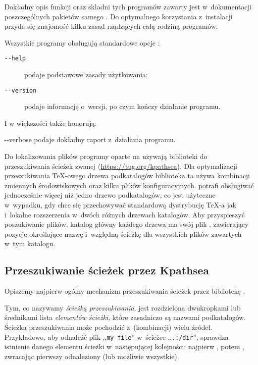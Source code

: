 \documentclass{article}
\renewcommand{\samp}[1]{,,\texttt{#1}''}  %
\begin{document}
\noindent
Dokładny opis funkcji oraz składni tych programów zawarty jest
w~dokumentacji poszczególnych pakietów samego \Webc{}.
Do optymalnego korzystania z~instalacji \Webc{}
przyda się  znajomość kilku zasad rządzących całą rodziną programów.

Wszystkie programy obsługują standardowe opcje \GNU:
\begin{description}
\item[\texttt{-{}-help\ \ \ }] podaje podstawowe zasady użytkowania;
\item[\texttt{-{}-version}] podaje informację o~wersji, po czym kończy
                          działanie programu.
\end{description}

I w większości także honorują:
\begin{ttdescription}
\item[-{}-verbose] podaje dokładny raport z~działania programu.
\end{ttdescription}



Do lokalizowania plików programy oparte na \Webc{} używają biblioteki do
przeszukiwania ścieżek zwanej \KPS{} (\url{https://tug.org/kpathsea}).
Dla optymalizacji przeszukiwania \TeX-owego drzewa podkatalogów biblioteka ta
używa kombinacji zmiennych środowiskowych oraz kilku plików konfiguracyjnych.
\Webc{} potrafi obsługiwać jednocześnie więcej niż jedno drzewo
podkatalogów, co jest użyteczne w~wypadku, gdy chce się  przechowywać
standardową dystrybucję \TeX-a jak i~lokalne rozszerzenia w~dwóch różnych
drzewach katalogów.
Aby przyspieszyć  poszukiwanie plików, katalog główny każdego drzewa ma swój
plik , zawierający pozycje określające nazwę i~względną ścieżkę
dla wszystkich plików zawartych w~tym katalogu.


\subsection{Przeszukiwanie ścieżek przez Kpathsea}
\label{sec:kpathsea}

Opiszemy najpierw ogólny mechanizm przeszukiwania ścieżek przez bibliotekę
\KPS{}.

Tym, co nazywamy \emph{ścieżką przeszukiwania}, jest rozdzielona dwukropkami
lub średnikami lista \emph{elementów ścieżki}, które zasadniczo są nazwami
podkatalogów.  Ścieżka przeszukiwania może pochodzić z~(kombinacji) wielu
źródeł.  Przykładowo, aby odnaleźć plik \samp{my-file} w~ścieżce
\samp{.:/dir}, \KPS{} sprawdza istnienie danego elementu ścieżki
w~następującej kolejności: najpierw , potem
, zwracając pierwszy odnaleziony (lub możliwie wszystkie).
\end{document}
